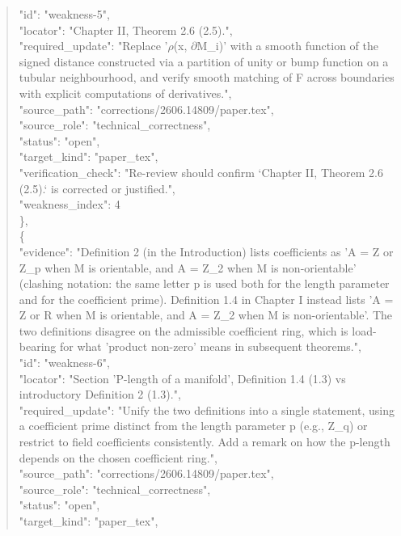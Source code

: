 \documentclass[11pt]{article}
\begin{document}
\begin{quote}
      "id": "weakness-5",\\
      "locator": "Chapter II, Theorem 2.6 (2.5).",\\
      "required\_update": "Replace '\ensuremath{\rho}(x, \ensuremath{\partial}M\_i)' with a smooth function of the signed distance constructed via a partition of unity or bump function on a tubular neighbourhood, and verify smooth matching of F across boundaries with explicit computations of derivatives.",\\
      "source\_path": "corrections/2606.14809/paper.tex",\\
      "source\_role": "technical\_correctness",\\
      "status": "open",\\
      "target\_kind": "paper\_tex",\\
      "verification\_check": "Re-review should confirm `Chapter II, Theorem 2.6 (2.5).` is corrected or justified.",\\
      "weakness\_index": 4\\
    \},\\
    \{\\
      "evidence": "Definition 2 (in the Introduction) lists coefficients as 'A = Z or Z\_p when M is orientable, and A = Z\_2 when M is non-orientable' (clashing notation: the same letter p is used both for the length parameter and for the coefficient prime). Definition 1.4 in Chapter I instead lists 'A = Z or R when M is orientable, and A = Z\_2 when M is non-orientable'. The two definitions disagree on the admissible coefficient ring, which is load-bearing for what 'product non-zero' means in subsequent theorems.",\\
      "id": "weakness-6",\\
      "locator": "Section 'P-length of a manifold', Definition 1.4 (1.3) vs introductory Definition 2 (1.3).",\\
      "required\_update": "Unify the two definitions into a single statement, using a coefficient prime distinct from the length parameter p (e.g., Z\_q) or restrict to field coefficients consistently. Add a remark on how the p-length depends on the chosen coefficient ring.",\\
      "source\_path": "corrections/2606.14809/paper.tex",\\
      "source\_role": "technical\_correctness",\\
      "status": "open",\\
      "target\_kind": "paper\_tex",\\

\end{quote}
\end{document}
